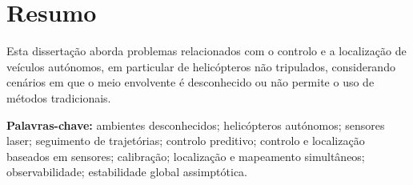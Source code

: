 \chapter{Resumo}

Esta dissertação aborda problemas relacionados com o controlo e a localização de 
veículos autónomos, em particular de helicópteros não tripulados, considerando 
cenários em que o meio envolvente é desconhecido ou não permite o uso de métodos 
tradicionais.


\noindent \textbf{Palavras-chave:}
ambientes desconhecidos;
helicópteros autónomos;
sensores laser;
seguimento de trajetórias;
controlo preditivo;
controlo e localização baseados em sensores; 
calibração;
localização e mapeamento simultâneos;
observabilidade;
estabilidade global assimptótica.

